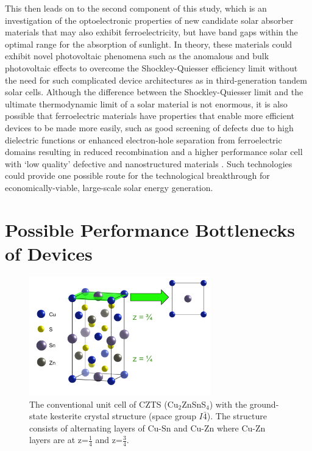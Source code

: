 This then leads on to the second component of this study, which is an investigation of the optoelectronic properties of new candidate solar absorber materials that may also exhibit ferroelectricity, but have band gaps within the optimal range for the absorption of sunlight. 
In theory, these materials 
could exhibit novel photovoltaic phenomena such as the anomalous and bulk photovoltaic effects to overcome the Shockley-Quiesser efficiency limit without the need for such complicated device architectures as in third-generation tandem solar cells. Although the difference between the Shockley-Quiesser limit and the ultimate thermodynamic limit of a solar material is not enormous, it is also possible that ferroelectric materials have properties that enable more efficient devices to be made more easily, such as good screening of defects due to high dielectric functions or enhanced electron-hole separation from ferroelectric domains resulting in reduced recombination and a higher performance solar cell with `low quality' defective and nanostructured materials \cite{Federico}. Such technologies could provide one possible route for the technological breakthrough for economically-viable, large-scale solar energy generation.

\section{Possible Performance Bottlenecks of {\CZTS } Devices}\label{bottlenecks}

\begin{figure}[h!]
  \centering
    \includegraphics[width=0.7\textwidth]{figures/CZTS_cell.png}
    \caption{The conventional unit cell of CZTS (Cu$_{2}$ZnSnS$_{4}$) with the ground-state kesterite crystal structure (space group $I\bar{4}$). The structure consists of alternating layers of Cu-Sn and Cu-Zn where Cu-Zn layers are at z=$\frac{1}{4}$ and z=$\frac{3}{4}$.}
  \label{CZTS_cell}
\end{figure}

